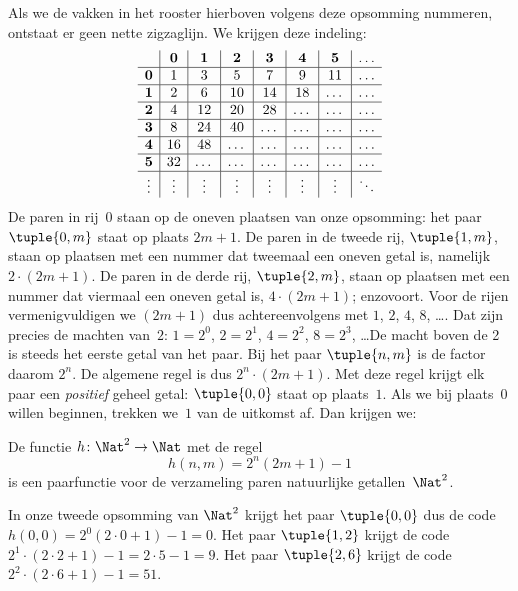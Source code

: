 \documentclass[openany]{memoir}
\begin{document}
\begin{explain}
\[\]
Als we de vakken in het rooster hierboven volgens deze opsomming nummeren,
ontstaat er geen nette zigzaglijn. We krijgen deze indeling:
\[
\begin{array}{ c | c | c | c | c | c | c | c }
& \mathbf 0 & \mathbf 1 & \mathbf 2 & \mathbf 3 & \mathbf 4 & \mathbf 5 & \dots \\
\hline
\mathbf 0 & 1 & 3 & 5 & 7 & 9 & 11 & \dots \\
\hline
\mathbf 1 & 2 & 6 & 10 & 14 & 18 & \dots & \dots \\
\hline
\mathbf 2 & 4 & 12 & 20 & 28 & \dots & \dots & \dots \\
\hline
\mathbf 3 & 8 & 24 & 40 & \dots & \dots & \dots & \dots \\
\hline
\mathbf 4 & 16 & 48 & \dots & \dots & \dots & \dots & \dots \\
\hline
\mathbf 5 & 32 & \dots & \dots & \dots & \dots & \dots & \dots \\
\hline
\vdots & \vdots & \vdots & \vdots & \vdots & \vdots & \vdots & \ddots\\
\end{array}
\]
De paren in rij~$0$ staan op de oneven plaatsen van onze opsomming: het paar
$\tuple{0,m}$ staat op plaats $2m+1$. De paren in de tweede rij,
$\tuple{1,m}$, staan op plaatsen met een nummer dat tweemaal een oneven getal
is, namelijk $2 \cdot (2m+1)$. De paren in de derde rij, $\tuple{2,m}$, staan
op plaatsen met een nummer dat viermaal een oneven getal is,
$4 \cdot (2m+1)$; enzovoort. Voor de rijen vermenigvuldigen we $(2m+1)$ dus
achtereenvolgens met $1$, $2$, $4$, $8$, \dots. Dat zijn precies de machten
van~$2$: $1= 2^0$, $2 = 2^1$, $4 = 2^2$, $8 = 2^3$, \dots\@ De macht boven
de 2 is steeds het eerste getal van het paar. Bij het paar $\tuple{n,m}$ is de
factor daarom $2^n$. De algemene regel is dus $2^n \cdot (2m+1)$. Met deze
regel krijgt elk paar een \emph{positief} geheel getal: $\tuple{0,0}$ staat op
plaats~$1$. Als we bij plaats~$0$ willen beginnen, trekken we~$1$ van de
uitkomst af. Dan krijgen we:
\end{explain}

\begin{ex}
De functie $h\colon \Nat^2 \to \Nat$ met de regel
\[
h(n,m) = 2^n (2m+1) - 1
\]
is een paarfunctie voor de verzameling paren natuurlijke getallen~$\Nat^2$.
\end{ex}

\begin{explain}
In onze tweede opsomming van $\Nat^2$ krijgt het paar $\tuple{0,0}$ dus de code
$h(0,0) = 2^0(2\cdot 0+1) - 1 = 0$. Het paar $\tuple{1,2}$ krijgt de code
$2^{1} \cdot (2 \cdot 2 + 1) - 1 = 2 \cdot 5 - 1 = 9$. Het paar
$\tuple{2,6}$ krijgt de code $2^{2} \cdot (2 \cdot 6 + 1) - 1 = 51$.
\end{explain}
\end{document}

